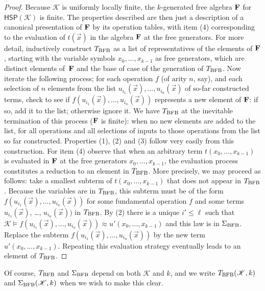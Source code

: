 \documentclass[reqno]{amsart}
\theoremstyle{plain}
\theoremstyle{definition}
\begin{document}
\begin{proof} 
Because $\mathscr{K}$ is uniformly locally finite, the $k$-generated free algebra ${\bf F}$ for $\mathsf{HSP}(\mathscr{K})$ is finite.  The properties described are then just a description of a canonical presentation of ${\bf F}$ by its operation tables, with item (4) corresponding to the evaluation of $t(\vec{x})$ in the algebra ${\bf F}$ at the free generators.  For more detail, inductively construct $T_{\rm BFB}$ as a list of representatives of the elements of ${\bf F}$, starting with the variable symbols $x_0,\dots,x_{k-1}$ as free generators, which are distinct elements of~${\bf F}$ and the base of case of the generation of $T_{\rm BFB}$.  Now iterate the following process; for each operation $f$ (of arity $n$, say), and each selection of $n$ elements from the list $u_{i_1}(\vec{x}),\dots,u_{i_n}(\vec{x})$ of so-far constructed terms, check to see if $f(u_{i_1}(\vec{x}),\dots,u_{i_n}(\vec{x}))$ represents a new element of ${\bf F}$: if so, add it to the list; otherwise ignore it.  We have $T_{\rm BFB}$ at the inevitable termination of this process (${\bf F}$ is finite): when no new elements are added to the list, for all operations and all selections of inputs to those operations from the list so far constructed. 
Properties (1), (2) and (3) follow very easily from this construction.    
For item (4) observe that when an arbitrary term $t(x_0,\dots,x_{k-1})$ is evaluated in ${\bf F}$ at the free generators $x_0,\dots,x_{k-1}$, the evaluation process constitutes a reduction to an element in $T_{\rm BFB}$.  More precisely, we may proceed as follows: take a smallest subterm of $t(x_0,\dots,x_{k-1})$ that does not appear in $T_{\rm BFB}$.  Because the variables are in $T_{\rm BFB}$, this subterm must be of the form $f(u_{i_1}(\vec{x}),\dots,u_{i_n}(\vec{x}))$ for some fundamental operation $f$ and some terms 
$u_{i_1}(\vec{x})$, \dots, $u_{i_n}(\vec{x}))$ in $T_{\rm BFB}$.  By (2) there is a unique $i'\leq \ell$ such that $\mathscr{K}\models f(u_{i_1}(\vec{x}),\dots,u_{i_n}(\vec{x}))\approx u'(x_0,\dots,x_{k-1})$ and this law is in $\Sigma_{\rm BFB}$.  Replace the subterm $f(u_{i_1}(\vec{x}),\dots,u_{i_n}(\vec{x}))$ by the new term $u'(x_0,\dots,x_{k-1})$.  Repeating this evaluation strategy eventually leads to an element of $T_{\rm BFB}$.  
\end{proof}

Of course, $T_{\rm BFB}$ and $\Sigma_{\rm BFB}$ depend on both $\mathscr{K}$ and $k$, and we write $T_{\rm BFB}(\mathscr{K},k)$ and $\Sigma_{\rm BFB}(\mathscr{K},k)$ when we wish to make this clear.
\end{document}
